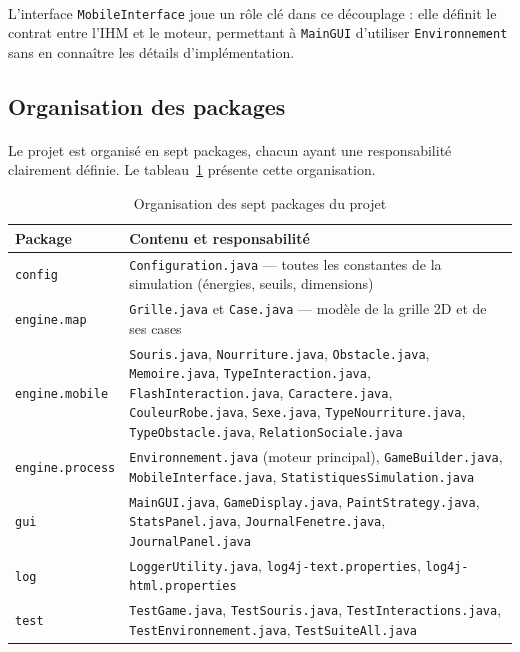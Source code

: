 \paragraph{} L'interface \texttt{MobileInterface} joue un rôle clé dans ce découplage : elle définit le contrat entre l'IHM et le moteur, permettant à \texttt{MainGUI} d'utiliser \texttt{Environnement} sans en connaître les détails d'implémentation.

\bigskip

\subsection{Organisation des packages}

\paragraph{} Le projet est organisé en sept packages, chacun ayant une responsabilité clairement définie. Le tableau~\ref{tab:packages} présente cette organisation.

\begin{table}[h!]
\centering
\renewcommand{\arraystretch}{1.4}
\begin{tabular}{|l|p{9cm}|}
\hline
\textbf{Package} & \textbf{Contenu et responsabilité} \\
\hline
\texttt{config} & \texttt{Configuration.java} --- toutes les constantes de la simulation (énergies, seuils, dimensions) \\
\hline
\texttt{engine.map} & \texttt{Grille.java} et \texttt{Case.java} --- modèle de la grille 2D et de ses cases \\
\hline
\texttt{engine.mobile} & \texttt{Souris.java}, \texttt{Nourriture.java}, \texttt{Obstacle.java}, \texttt{Memoire.java}, \texttt{TypeInteraction.java}, \texttt{FlashInteraction.java}, \texttt{Caractere.java}, \texttt{CouleurRobe.java}, \texttt{Sexe.java}, \texttt{TypeNourriture.java}, \texttt{TypeObstacle.java}, \texttt{RelationSociale.java} \\
\hline
\texttt{engine.process} & \texttt{Environnement.java} (moteur principal), \texttt{GameBuilder.java}, \texttt{MobileInterface.java}, \texttt{StatistiquesSimulation.java} \\
\hline
\texttt{gui} & \texttt{MainGUI.java}, \texttt{GameDisplay.java}, \texttt{PaintStrategy.java}, \texttt{StatsPanel.java}, \texttt{JournalFenetre.java}, \texttt{JournalPanel.java} \\
\hline
\texttt{log} & \texttt{LoggerUtility.java}, \texttt{log4j-text.properties}, \texttt{log4j-html.properties} \\
\hline
\texttt{test} & \texttt{TestGame.java}, \texttt{TestSouris.java}, \texttt{TestInteractions.java}, \texttt{TestEnvironnement.java}, \texttt{TestSuiteAll.java} \\
\hline
\end{tabular}
\caption{Organisation des sept packages du projet}
\label{tab:packages}
\end{table}

